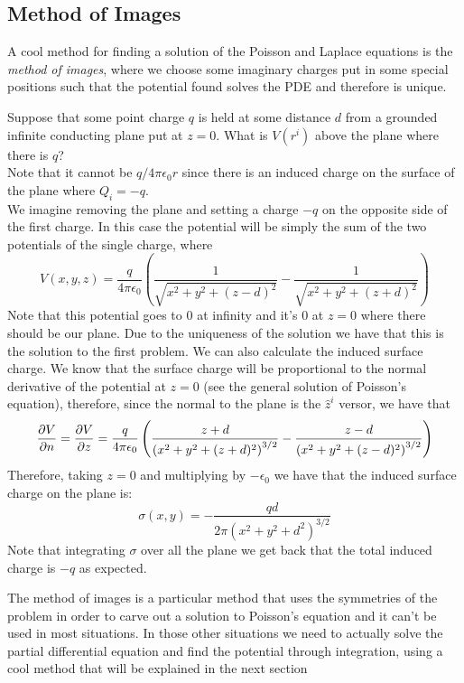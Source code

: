 \documentclass[../electromagnetism]{subfiles}
\begin{document}
\subsection{Method of Images}%
A cool method for finding a solution of the Poisson and Laplace equations is the \textit{method of images}, where we choose some imaginary charges put in some special positions such that the potential found solves the PDE and therefore is unique.\\
\begin{eg}
	Suppose that some point charge $q$ is held at some distance $d$ from a grounded infinite conducting plane put at $z=0$. What is $V(r^i)$ above the plane where there is $q$?\\
	Note that it cannot be $q/4\pi\epsilon_0r$ since there is an induced charge on the surface of the plane where $Q_i=-q$.\\
	We imagine removing the plane and setting a charge $-q$ on the opposite side of the first charge. In this case the potential will be simply the sum of the two potentials of the single charge, where
	\begin{equation*}
		V(x,y,z)=\frac{q}{4\pi\epsilon_0}\left( \frac{1}{\sqrt{x^2+y^2+(z-d)^2}}-\frac{1}{\sqrt{x^2+y^2+(z+d)^2}} \right)
	\end{equation*}
	Note that this potential goes to 0 at infinity and it's 0 at $z=0$ where there should be our plane. Due to the uniqueness of the solution we have that this is the solution to the first problem. We can also calculate the induced surface charge. We know that the surface charge will be proportional to the normal derivative of the potential at $z=0$ (see the general solution of Poisson's equation), therefore, since the normal to the plane is the $\hat{z}^i$ versor, we have that
	\begin{equation*}
		\pdv{V}{n}=\pdv{V}{z}=\frac{q}{4\pi\epsilon_0}\left( \frac{z+d}{\left( x^2+y^2+(z+d)^2 \right)^{3/2}}-\frac{z-d}{\left( x^2+y^2+(z-d)^2 \right)^{3/2}} \right)
	\end{equation*}
	Therefore, taking $z=0$ and multiplying by $-\epsilon_0$ we have that the induced surface charge on the plane is:
	\begin{equation*}
		\sigma(x,y)=-\frac{qd}{2\pi\left( x^2+y^2+d^2 \right)^{3/2}}
	\end{equation*}
	Note that integrating $\sigma$ over all the plane we get back that the total induced charge is $-q$ as expected.
\end{eg}
The method of images is a particular method that uses the symmetries of the problem in order to carve out a solution to Poisson's equation and it can't be used in most situations. In those other situations we need to actually solve the partial differential equation and find the potential through integration, using a cool method that will be explained in the next section
\end{document}

